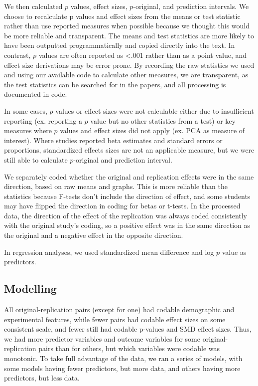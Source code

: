 \documentclass[
  english,
  a4paper,
]{article}
\begin{document}
We then calculated \(p\) values, effect sizes, \(p\)-original, and prediction intervals. We choose to recalculate p values and effect sizes from the means or test statistic rather than use reported measures when possible because we thought this would be more reliable and transparent. The means and test statistics are more likely to have been outputted programmatically and copied directly into the text. In contrast, \(p\) values are often reported as \textless.001 rather than as a point value, and effect size derivations may be error prone. By recording the raw statistics we used and using our available code to calculate other measures, we are transparent, as the test statistics can be searched for in the papers, and all processing is documented in code.

In some cases, \(p\) values or effect sizes were not calculable either due to insufficient reporting (ex. reporting a \(p\) value but no other statistics from a test) or key measures where \(p\) values and effect sizes did not apply (ex. PCA as measure of interest). Where studies reported beta estimates and standard errors or proportions, standardized effects sizes are not an applicable measure, but we were still able to calculate \(p\)-original and prediction interval.

We separately coded whether the original and replication effects were in the same direction, based on raw means and graphs. This is more reliable than the statistics because F-tests don't include the direction of effect, and some students may have flipped the direction in coding for betas or t-tests. In the processed data, the direction of the effect of the replication was always coded consistently with the original study's coding, so a positive effect was in the same direction as the original and a negative effect in the opposite direction.

In regression analyses, we used standardized mean difference and log \(p\) value as predictors.

\hypertarget{modelling}{%
\subsection{Modelling}\label{modelling}}

All original-replication pairs (except for one) had codable demographic and experimental features, while fewer pairs had codable effect sizes on some consistent scale, and fewer still had codable p-values and SMD effect sizes. Thus, we had more predictor variables and outcome variables for some original-replication pairs than for others, but which variables were codable was monotonic. To take full advantage of the data, we ran a series of models, with some models having fewer predictors, but more data, and others having more predictors, but less data.
\end{document}
